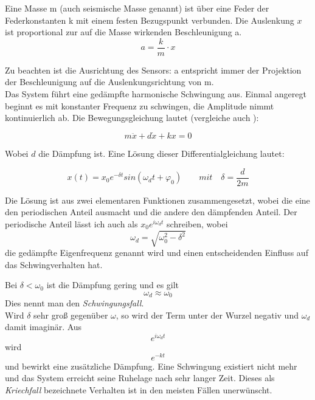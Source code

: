 \documentclass[12pt,a4paper,twoside,BCOR=12.5mm]{scrartcl}
\begin{document}
Eine Masse m (auch seismische Masse genannt) ist über eine Feder der Federkonstanten k mit einem festen Bezugspunkt verbunden. Die Auslenkung $x$ ist proportional zur auf die Masse wirkenden Beschleunigung a.
\begin{equation}
a = \frac{k}{m} \cdot x
\end{equation}

Zu beachten ist die Ausrichtung des Sensors: a entspricht immer der Projektion der Beschleunigung auf die Auslenkungsrichtung von m.\\

Das System führt eine gedämpfte harmonische Schwingung aus. Einmal angeregt beginnt es mit konstanter Frequenz zu schwingen, die Amplitude nimmt kontinuierlich ab. Die Bewegungsgleichung lautet (vergleiche auch \citep{Meschede:2001fk}):

\begin{equation}
m \ddot x + d \dot x + kx = 0
\end{equation}

Wobei $d$ die Dämpfung ist.
Eine Lösung dieser Differentialgleichung lautet:

\begin{equation}
x(t) = x_0 e^{-\delta t} sin(\omega_d t + \varphi_0) \qquad mit \quad \delta = \frac{d}{2m}
\end{equation}

Die Lösung ist aus zwei elementaren Funktionen zusammengesetzt, wobei die eine den periodischen Anteil ausmacht und die andere den dämpfenden Anteil. Der periodische Anteil lässt ich auch als $x_0 e^{i\omega_d t}$ schreiben, wobei 
\begin{equation}
\omega_d = \sqrt{\omega_0^2 - \delta^2}
\end{equation}
die gedämpfte Eigenfrequenz genannt wird und einen entscheidenden Einfluss auf das Schwingverhalten hat.

Bei $\delta < \omega_0$ ist die Dämpfung gering und es gilt
\begin{equation}
\omega_d \approx \omega_0
\end{equation}
Dies nennt man den \textit{Schwingungsfall}.\\

Wird $\delta$ sehr groß gegenüber $\omega$, so wird der Term unter der Wurzel negativ und $\omega_d$ damit imaginär. Aus 
\begin{equation}
e^{i\omega_d t}
\end{equation}
wird
\begin{equation}
e^{-k t}
\end{equation}
und bewirkt eine zusätzliche Dämpfung. Eine Schwingung existiert nicht mehr und das System erreicht seine Ruhelage nach sehr langer Zeit. Dieses als \textit{Kriechfall} bezeichnete Verhalten ist in den meisten Fällen unerwünscht. \\
\end{document}
